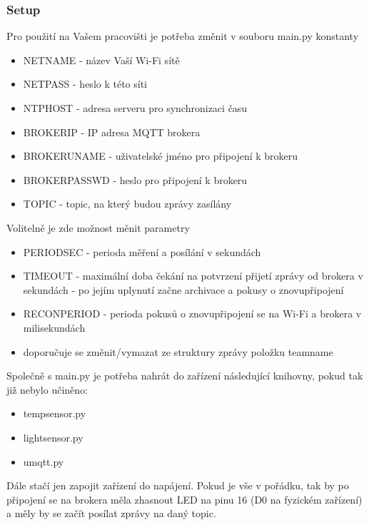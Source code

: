 \subsubsection{Setup}
Pro použití na Vašem pracovišti je potřeba změnit v souboru main.py konstanty
\begin{itemize}
    \item NET\textunderscore NAME - název Vaší Wi-Fi sítě
    \item NET\textunderscore PASS - heslo k této síti
    \item NTP\textunderscore HOST - adresa serveru pro synchronizaci času
    \item BROKER\textunderscore IP - IP adresa MQTT brokera
    \item BROKER\textunderscore UNAME - uživatelské jméno pro připojení k brokeru
    \item BROKER\textunderscore PASSWD - heslo pro připojení k brokeru
    \item TOPIC - topic, na který budou zprávy zasílány
\end{itemize}
Volitelně je zde možnost měnit parametry
\begin{itemize}
    \item PERIOD\textunderscore SEC - perioda měření a posílání v sekundách
    \item TIMEOUT - maximální doba čekání na potvrzení přijetí zprávy od brokera v sekundách - po jejím uplynutí začne archivace a pokusy o znovupřipojení
    \item RECON\textunderscore PERIOD - perioda pokusů o znovupřipojení se na Wi-Fi a brokera v milisekundách
    \item doporučuje se změnit/vymazat ze struktury zprávy položku team\textunderscore name
\end{itemize}
Společně s main.py je potřeba nahrát do zařízení následující knihovny, pokud tak již nebylo učiněno:
\begin{itemize}
    \item temp\textunderscore sensor.py
    \item light\textunderscore sensor.py
    \item umqtt.py
\end{itemize}
Dále stačí jen zapojit zařízení do napájení. Pokud je vše v pořádku, tak by po připojení se na brokera měla zhasnout LED na pinu 16 (D0 na fyzickém zařízení) a měly by se začít posílat zprávy na daný topic.
